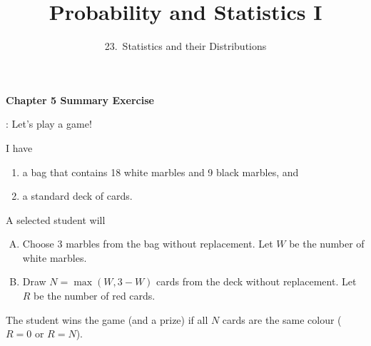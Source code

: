 

\hypersetup{
  colorlinks=true,
  linkcolor=blue,
  filecolor=magenta,      
  urlcolor=blue,
}
  
\newcommand{\lecturenum}{23}

\title[SS2857]{Probability and Statistics I}
\subtitle{\lecturenum.~Statistics and their Distributions}

\date{}






{

\begin{frame}
  \addtocounter{framenumber}{-1}

  \maketitle
\end{frame}
}

\begin{frame}
  \frametitle{}
  
  \begin{center}
    \Large{\textbf{Chapter 5 Summary Exercise}}

    \bigskip

  \end{center}
  
\end{frame}

\begin{frame}

\begin{block}{\exercise: Let's play a game!} 

I have 

\begin{enumerate}[1)]
\item a bag that contains 18 white marbles and 9 black marbles, and 
\item a standard deck of cards. 
\end{enumerate}

A selected student will 
\begin{enumerate}[A)]
\item Choose 3 marbles from the bag without replacement. Let $W$ be the number of white marbles. 
\item Draw $N=\max(W,3-W)$ cards from the deck without replacement. Let $R$ be the number of red cards. 
\end{enumerate}
The student wins the game (and a prize) if all $N$ cards are the same colour ($R=0$ or $R=N$). 
\end{block}
\end{frame}

